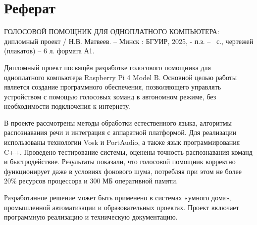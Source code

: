 \section*{Реферат}
\thispagestyle{empty} %

\nohyphens{ГОЛОСОВОЙ ПОМОЩНИК ДЛЯ ОДНОПЛАТНОГО КОМПЬЮТЕРА}: дипломный проект / Н.В. Матвеев. – Минск : БГУИР, 2025, - п.з. – \pageref{LastPage}~с., чертежей (плакатов) – 6 л. формата А1.

Дипломный проект посвящён разработке голосового помощника для одноплатного компьютера Raspberry Pi 4 Model B. Основной целью работы является создание программного обеспечения, позволяющего управлять устройством с помощью голосовых команд в автономном режиме, без необходимости подключения к интернету.

В проекте рассмотрены методы обработки естественного языка, алгоритмы распознавания речи и интеграция с аппаратной платформой. Для реализации использованы технологии Vosk и PortAudio, а также язык программирования C++. Проведено тестирование системы, оценены точность распознавания команд и быстродействие. Результаты показали, что голосовой помощник корректно функционирует даже в условиях фонового шума, потребляя при этом не более 20\% ресурсов процессора и 300 МБ оперативной памяти.

Разработанное решение может быть применено в системах «умного дома», промышленной автоматизации и образовательных проектах. Проект включает программную реализацию и техническую документацию.

\clearpage
